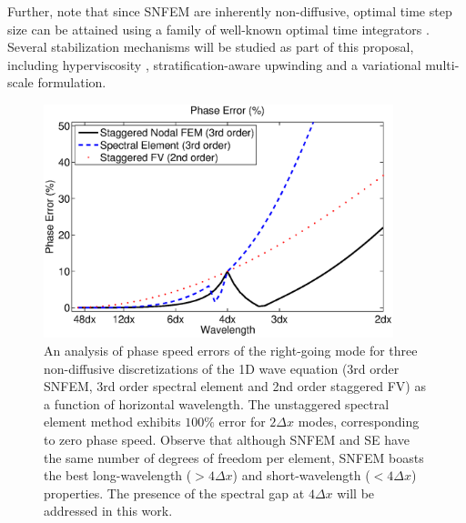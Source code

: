 \documentclass[11pt]{article}
\begin{document}
Further, note that since SNFEM are inherently non-diffusive, optimal time step size can be attained using a family of well-known optimal time integrators \cite{kinnmark1984one}.  Several stabilization mechanisms will be studied as part of this proposal, including hyperviscosity \cite{guba2014viscosity, ullrich2014global}, stratification-aware upwinding and a variational multi-scale formulation.

\begin{figure}
\begin{center}
\includegraphics[width=4in, clip=true, trim=0cm 0.1cm 0cm 0.1cm]{PhaseErrors}
\end{center}
\caption{An analysis of phase speed errors of the right-going mode for three non-diffusive discretizations of the 1D wave equation (3rd order SNFEM, 3rd order spectral element and 2nd order staggered FV) as a function of horizontal wavelength.  The unstaggered spectral element method exhibits $100\%$ error for $2 \Delta x$ modes, corresponding to zero phase speed.  Observe that although SNFEM and SE have the same number of degrees of freedom per element, SNFEM boasts the best long-wavelength ($> 4 \Delta x$) and short-wavelength ($< 4 \Delta x$) properties.  The presence of the spectral gap at $4 \Delta x$ will be addressed in this work.} \label{fig:SNFEMEigenstructure}
\end{figure}
\end{document}
